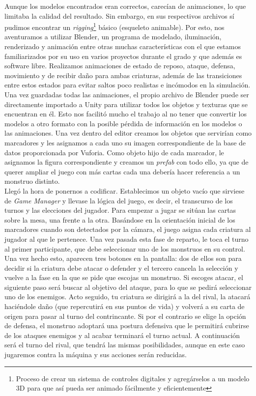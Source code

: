 Aunque los modelos encontrados eran correctos, carecían de animaciones, lo que limitaba la calidad del resultado. Sin embargo, en sus respectivos archivos sí pudimos encontrar un \textit{rigging}\footnote{ Proceso de crear un sistema de controles digitales y agregárselos a un modelo 3D para que así pueda ser animado fácilmente y eficientemente} básico (esqueleto animable).
Por esto, nos aventuramos a utilizar Blender, un programa de modelado, iluminación, renderizado y animación entre otras muchas características con el que estamos familiarizados por su uso en varios proyectos durante el grado y que además es software libre. Realizamos animaciones de estado de reposo, ataque, defensa, movimiento y de recibir daño para ambas criaturas, además de las transiciones entre estos estados para evitar saltos poco realistas e incómodos en la simulación.\\

Una vez guardadas todas las animaciones, el propio archivo de Blender puede ser directamente importado a Unity para utilizar todos los objetos y texturas que se encuentran en él. Esto nos facilitó mucho el trabajo al no tener que convertir los modelos a otro formato con la posible pérdida de información en los modelos o las animaciones. Una vez dentro del editor creamos los objetos que servirían como marcadores y les asignamos a cada uno su imagen correspondiente de la base de datos proporcionada por Vuforia. Como objeto hijo de cada marcador, le asignamos la figura correspondiente y creamos un \textit{prefab} con todo ello, ya que de querer ampliar el juego con más cartas cada una debería hacer referencia a un monstruo distinto.\\

Llegó la hora de ponernos a codificar. Establecimos un objeto vacío que sirviese de \textit{Game Manager} y llevase la lógica del juego, es decir, el transcurso de los turnos y las elecciones del jugador. Para empezar a jugar se sitúan las cartas sobre la mesa, una frente a la otra. Basándose en la orientación inicial de los marcadores cuando son detectados por la cámara, el juego asigna cada criatura al jugador al que le pertenece. Una vez pasada esta fase de reparto, le toca el turno al primer participante, que debe seleccionar uno de los monstruos en su control. Una vez hecho esto, aparecen tres botones en la pantalla: dos de ellos son para decidir si la criatura debe atacar o defender y el tercero cancela la selección y vuelve a la fase en la que se pide que escojas un monstruo. Si escoges atacar, el siguiente paso será buscar al objetivo del ataque, para lo que se pedirá seleccionar uno de los enemigos. Acto seguido, tu criatura se dirigirá a la del rival, la atacará haciéndole daño (que repercutirá en sus puntos de vida) y volverá a su carta de origen para pasar al turno del contrincante. Si por el contrario se elige la opción de defensa, el monstruo adoptará una postura defensiva que le permitirá cubrirse de los ataques enemigos y al acabar terminará el turno actual. A continuación será el turno del rival, que tendrá las mismas posibilidades, aunque en este caso jugaremos contra la máquina y sus acciones serán reducidas.\\

